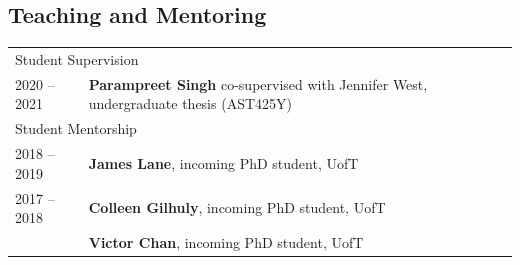 \documentclass[10pt]{res} %
\begin{document}
\begin{resume}

\section{\Large Teaching and Mentoring}
\vspace{-5pt} %
\noindent\makebox[\linewidth]{\rule{\textwidth}{0.4pt}}
\vspace{-20pt} %
\begin{table}[h!]
\begin{tabularx}{\textwidth}{ @{} p{6.5em} X @{} }
% 
% 
\multicolumn{2}{l}{ \rule{0pt}{3ex} \large \hspace{-12pt} Student Supervision \dotfill \rule[-1.2ex]{0pt}{0pt}} \\
2020 -- 2021 & \textbf{Parampreet Singh} co-supervised with Jennifer West, undergraduate thesis (AST425Y) \\
% 
% 
\multicolumn{2}{l}{ \rule{0pt}{3ex} \large \hspace{-12pt} Student Mentorship \dotfill \rule[-1.2ex]{0pt}{0pt}} \\
2018 -- 2019 & \textbf{James Lane}, incoming PhD student, UofT \\
2017 -- 2018 & \textbf{Colleen Gilhuly}, incoming PhD student, UofT \\
                     & \textbf{Victor Chan}, incoming PhD student, UofT 
\end{tabularx}
\end{table}



\end{resume}
\end{document}
